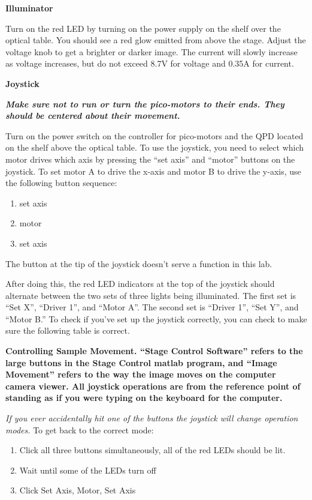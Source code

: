 \documentclass{../lab}
\begin{document}
\textbf{Illuminator}

Turn on the red LED by turning on the power supply on the shelf over the optical table. You should see a  red glow emitted from above the stage. Adjust the voltage knob to get a brighter or darker image. The current will slowly increase as voltage increases, but do not exceed 8.7V for voltage and 0.35A for current.

\textbf{Joystick}

\emph{\textbf{Make sure not to run or turn the pico-motors to their ends. They should be centered about their movement.}}

Turn on the power switch on the controller for pico-motors and the QPD located on the shelf above the optical table. To use the joystick, you need to select which motor drives which axis by pressing the ``set axis'' and ``motor'' buttons on the joystick. To set motor A to drive the x-axis and motor B to drive the y-axis, use the following button sequence:

\begin{enumerate}
    \item set axis

    \item motor

    \item set axis

\end{enumerate}

The button at the tip of the joystick doesn't serve a function in this lab.

After doing this, the red LED indicators at the top of the joystick should alternate between the two sets of three lights being illuminated. The first set is ``Set X'', ``Driver 1'', and ``Motor A''. The second set is ``Driver 1'', ``Set Y'', and ``Motor B.'' To check if you've set up the joystick correctly, you can check to make sure the following table is correct.

\textbf{Controlling Sample Movement. ``Stage Control Software'' refers to the large buttons in the Stage Control matlab program, and ``Image Movement'' refers to the way the image moves on the computer camera viewer.  All joystick operations are from the reference point of standing as if you were typing on the keyboard for the computer.}


\emph{If you ever accidentally hit one of the buttons the joystick will change operation modes.} To get back to the correct mode:

\begin{enumerate}
    \item Click all three buttons simultaneously, all of the red LEDs should be lit.

    \item Wait until some of the LEDs turn off

    \item Click Set Axis, Motor, Set Axis

\end{enumerate}
\end{document}
